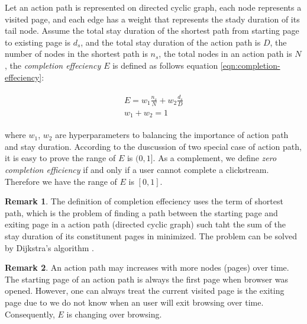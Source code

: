 Let an action path is represented on directed cyclic graph, each node represents a visited page,
and each edge has a weight that represents the stady duration of its tail node.
Assume the total stay duration of the shortest path from starting page to existing page
is $d_s$, and the total stay duration of the action path is $D$, 
the number of nodes in the shortest path is $n_s$, the total nodes 
in an action path is $N$, the \emph{completion effeciency $E$} is defined 
as follows equation \ref{eqn:completion-effeciency}:

\begin{align}
\label{eqn:completion-effeciency}
\begin{split}
    E = w_1 \frac{n_s}{N} + w_2 \frac{d_s}{D}\\
    w_1 + w_2 = 1
\end{split}
\end{align}

where $w_1$, $w_2$ are hyperparameters to balancing the importance of action path 
and stay duration. According to the duscussion of two special case of action path,
it is easy to prove the range of $E$ is $(0, 1]$. As a complement, we define \emph{zero
completion efficiency} if and only if a user cannot complete a clickstream. Therefore
we have the range of $E$ is $[0, 1]$.

\textbf{Remark 1}. The definition of completion effeciency uses the term of shortest path,
which is the problem of finding a path between the starting page and exiting page
 in a action path (directed cyclic graph) such taht the sum of
the stay duration of its constitunent pages in minimized.
The problem can be solved by Dijkstra's algorithm \cite{dijkstra1959note}.

\textbf{Remark 2}. An action path may increases with more nodes (pages) over time.
The starting page of an action path is always the first page when browser was opened.
However, one can always treat the current visited page is the exiting page due to we
do not know when an user will exit browsing over time. Consequently, $E$ is changing over
browsing.



